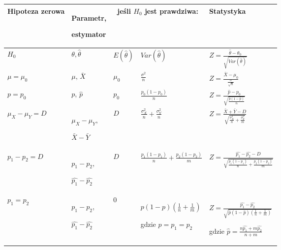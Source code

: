 \documentclass[main.tex]{subfiles}
\begin{document}
    \begin{table}[H]
        \begin{center}
            \begin{tabular}{ p{2.5cm} |p{2.5cm} |p{1.5cm} |p{4cm} |p{4cm}}
                \toprule
                Hipoteza zerowa & Parametr,

                estymator & \multicolumn{2}{c|}{jeśli $H_0$ jest prawdziwa:} & Statystyka \\
                \toprule

                $H_0$ & $\theta, \hat{\theta}$ & $E(\hat{\theta})$ & $Var(\hat{\theta})$ & $Z = \frac{\hat{\theta} - \theta_0}{\sqrt{Var(\hat{\theta})}}$\\

                \cmidrule(r){1-5}

                $\mu = \mu_0$ & $\mu$, $\bar{X}$ & $\mu_0$ & $\frac{\sigma^2}{n}$ & $Z = \frac{\bar{X} - \mu_0}{\frac{\sigma}{\sqrt{n}}}$\\

                \cmidrule(r){1-5}

                $p = p_0$ & $p$, $\hat{p}$ & $p_0$ & $\frac{p_0(1-p_0)}{n}$ & $Z = \frac{\hat{p} - p_0}{\sqrt{\frac{\hat{p}(1-\hat{p})}{n}}}$\\

                \cmidrule(r){1-5}

                $\mu_X - \mu_Y = D$ &
                $\mu_X - \mu_Y$,

                $\bar{X} - \bar{Y}$
                & $D$ & $\frac{\sigma_X^2}{n} + \frac{\sigma_Y^2}{n}$ & $Z = \frac{\bar{X} + \bar{Y} - D}{\sqrt{\frac{\sigma_X^2}{n} + \frac{\sigma_Y^2}{m}}}$\\

                \cmidrule(r){1-5}

                $p_1 - p_2 = D$ & $p_1 - p_2$,

                $\hat{p_1} - \hat{p_2}$
                & $D$ & $\frac{p_1(1-p_1)}{n} + \frac{p_2(1-p_2)}{m}$ &
                $Z = \frac{\hat{p_1} - \hat{p_2} - D}{\sqrt{\frac{\hat{p_1}(1-\hat{p_1})}{n} + \frac{\hat{p_2}(1-\hat{p_2})}{m}}}$\\

                \cmidrule(r){1-5}

                $p_1 = p_2$ & $p_1 - p_2$,

                $\hat{p_1} - \hat{p_2}$ & $0$ & $p(1-p)\left(\frac{1}{n} + \frac{1}{m}\right)$

                gdzie $p = p_1 = p_2$ & $Z = \frac{\hat{p_1} - \hat{p_2}}{\sqrt{\hat{p}(1-\hat{p})\left(\frac{1}{n} + \frac{1}{m}\right)}}$

                gdzie $\hat{p} = \frac{n\hat{p_1} + m\hat{p_2}}{n + m}$\\
                \bottomrule
            \end{tabular}
        \end{center}
    \end{table}
\end{document}
